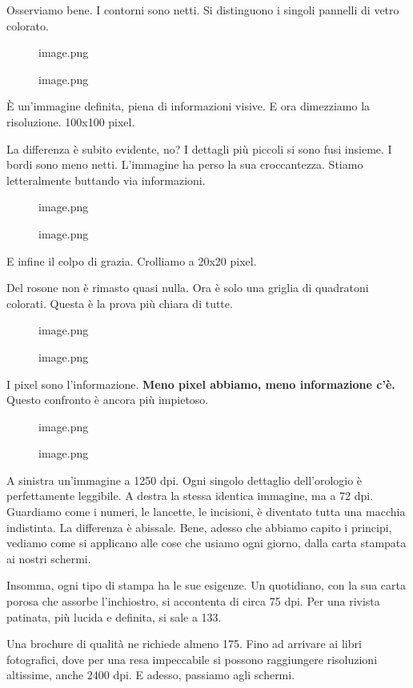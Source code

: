 \documentclass[
]{article}
\begin{document}
Osserviamo bene. I contorni sono netti. Si distinguono i singoli pannelli di vetro colorato.

\begin{figure}
\centering
{image.png}
\caption{image.png}
\end{figure}

È un'immagine definita, piena di informazioni visive. E ora dimezziamo la risoluzione. 100x100 pixel.

La differenza è subito evidente, no? I dettagli più piccoli si sono fusi insieme. I bordi sono meno netti. L'immagine ha perso la sua croccantezza.
Stiamo letteralmente buttando via informazioni.

\begin{figure}
\centering
{image.png}
\caption{image.png}
\end{figure}

E infine il colpo di grazia. Crolliamo a 20x20 pixel.

Del rosone non è rimasto quasi nulla. Ora è solo una griglia di quadratoni colorati. Questa è la prova più chiara di tutte.

\begin{figure}
\centering
{image.png}
\caption{image.png}
\end{figure}

I pixel sono l'informazione. \textbf{Meno pixel abbiamo, meno informazione c'è.} Questo confronto è ancora più impietoso.

\begin{figure}
\centering
{image.png}
\caption{image.png}
\end{figure}

A sinistra un'immagine a 1250 dpi. Ogni singolo dettaglio dell'orologio è perfettamente leggibile. A destra la stessa identica immagine, ma a 72 dpi.
Guardiamo come i numeri, le lancette, le incisioni, è diventato tutta una macchia indistinta. La differenza è abissale.
Bene, adesso che abbiamo capito i principi, vediamo come si applicano alle cose che usiamo ogni giorno, dalla carta stampata ai nostri schermi.

Insomma, ogni tipo di stampa ha le sue esigenze. Un quotidiano, con la sua carta porosa che assorbe l'inchiostro, si accontenta di circa 75 dpi. Per una rivista patinata, più lucida e definita, si sale a 133.

Una brochure di qualità ne richiede almeno 175. Fino ad arrivare ai libri fotografici, dove per una resa impeccabile si possono raggiungere risoluzioni altissime, anche 2400 dpi. E adesso, passiamo agli schermi.
\end{document}

